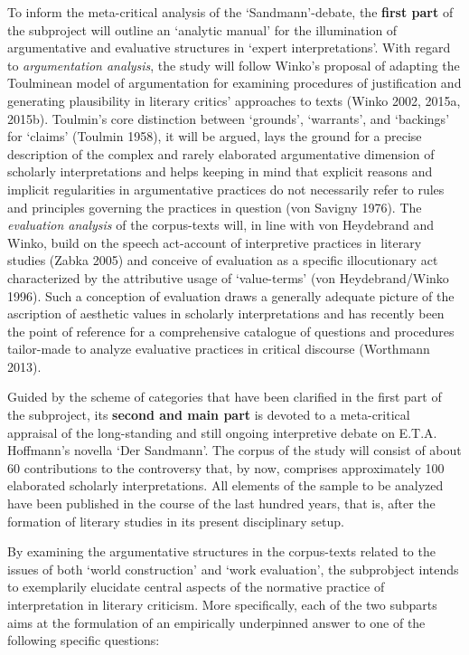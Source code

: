To inform  the meta-critical analysis of the `Sandmann'-debate, the \textbf{first part} of the subproject will outline an `analytic manual' for the illumination of argumentative and evaluative structures in `expert interpretations'. With regard to \emph{argumentation analysis}, the study will follow Winko's proposal of adapting the Toulminean model of argumentation for examining procedures of justification and generating plausibility in literary critics' approaches to texts (Winko 2002, 2015a, 2015b). Toulmin's core distinction between `grounds', `warrants', and `backings' for `claims' (Toulmin 1958), it will be argued, lays the ground for a precise description of the complex and rarely elaborated argumentative dimension of scholarly interpretations and helps keeping in mind that explicit reasons and implicit regularities in argumentative practices do not necessarily refer to rules and principles governing the practices in question (von Savigny 1976). The \emph{evaluation analysis} of the corpus-texts will, in line with von Heydebrand and Winko, build on the speech act-account of interpretive practices in literary studies (Zabka 2005) and conceive of evaluation as a specific illocutionary act characterized by the attributive usage of `value-terms' (von Heydebrand/Winko 1996). Such a conception of evaluation draws a generally adequate picture of the ascription of aesthetic values in scholarly interpretations and has recently been the point of reference for a comprehensive catalogue of questions and procedures tailor-made to analyze evaluative practices in critical discourse (Worthmann 2013).


Guided by the scheme of categories that have been clarified in the first part of the subproject, its \textbf{second and main part} is devoted to a meta-critical appraisal of the long-standing and still ongoing interpretive debate on E.T.A. Hoffmann's novella `Der Sandmann'. The corpus of the study will consist of about 60 contributions to the controversy that, by now, comprises approximately 100 elaborated scholarly interpretations. All elements of the sample to be analyzed have been published in the course of the last hundred years, that is, after the formation of literary studies in its present disciplinary setup. 

By examining the argumentative structures in the corpus-texts related to the issues of both `world construction' and `work evaluation', the subprobject intends to exemplarily elucidate central aspects of the normative practice of interpretation in literary criticism. More specifically, each of the two subparts aims at the formulation of an empirically underpinned answer to one of the following specific questions:

